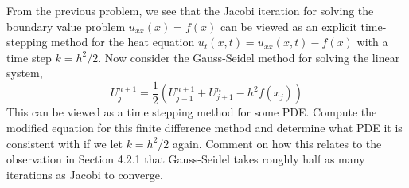 \documentclass[12pt]{report}
\begin{document}
\newpage



\begin{problem}
    From the previous problem, we see that the Jacobi iteration for solving the boundary value problem $u_{x x}(x)=f(x)$ can be viewed as an explicit time-stepping method for the heat equation $u_{t}(x, t)=u_{x x}(x, t)-f(x)$ with a time step $k=h^{2} / 2$. Now consider the Gauss-Seidel method for solving the linear system,
    $$
      U_{j}^{n+1}=\frac{1}{2}\left(U_{j-1}^{n+1}+U_{j+1}^{n}-h^{2} f\left(x_{j}\right)\right)
    $$
    This can be viewed as a time stepping method for some PDE. Compute the modified equation for this finite difference method and determine what PDE it is consistent with if we let $k=h^{2} / 2$ again. Comment on how this relates to the observation in Section 4.2.1 that Gauss-Seidel takes roughly half as many iterations as Jacobi to converge.
\end{problem}
\end{document}
